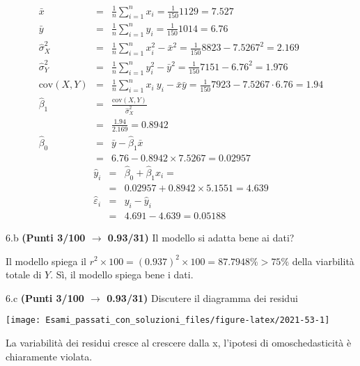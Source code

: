 \documentclass[
  11pt,
]{book}
\theoremstyle{mytheoremstyle}
\theoremstyle{mydefstyle}
\newenvironment{sol}
  {
  \begin{tcolorbox}[enhanced,breakable,arc=0.1mm,boxrule=1pt,colback=white,colframe=iblue,
  title=\bf \fontfamily{lmss}\selectfont \hspace{.5 cm} Soluzione,drop fuzzy shadow]

}{
\end{tcolorbox}
  }
\begin{document}
\begin{sol}
\begin{eqnarray*}
           \bar x &=&\frac 1 n\sum_{i=1}^n x_i = \frac {1}{ 150 }  1129 =  7.527 \\
           \bar y &=&\frac 1 n\sum_{i=1}^n y_i = \frac {1}{ 150 }  1014 =  6.76 \\
           \hat\sigma_X^2&=&\frac 1 n\sum_{i=1}^n x_i^2-\bar x^2=\frac {1}{ 150 }  8823  - 7.5267 ^2= 2.169 \\
           \hat\sigma_Y^2&=&\frac 1 n\sum_{i=1}^n y_i^2-\bar y^2=\frac {1}{ 150 }  7151  - 6.76 ^2= 1.976 \\
           \text{cov}(X,Y)&=&\frac 1 n\sum_{i=1}^n x_i~y_i-\bar x\bar y=\frac {1}{ 150 }  7923 - 7.5267 \cdot 6.76 = 1.94 \\
           \hat\beta_1 &=& \frac{\text{cov}(X,Y)}{\hat\sigma_X^2} \\
                    &=& \frac{ 1.94 }{ 2.169 }  =  0.8942 \\
           \hat\beta_0 &=& \bar y - \hat\beta_1 \bar x\\
                    &=&  6.76 - 0.8942 \times  7.5267 = 0.02957 
         \end{eqnarray*}\begin{eqnarray*}
\hat y_i &=&\hat\beta_0+\hat\beta_1 x_i=\\ 
&=& 0.02957 + 0.8942 \times 5.1551 = 4.639 \\ 
\hat \varepsilon_i &=& y_i-\hat y_i\\ 
&=& 4.691 - 4.639 = 0.05188  
\end{eqnarray*}

\end{sol}

6.b \textbf{(Punti 3/100 \(\rightarrow\) 0.93/31)} Il modello si adatta bene ai dati?

\begin{sol}
Il modello spiega il \(r^2\times100=(0.937)^2\times 100=87.7948\%>75\%\) della viarbilità totale di \(Y\). Sì, il modello spiega bene i dati.

\end{sol}

6.c \textbf{(Punti 3/100 \(\rightarrow\) 0.93/31)} Discutere il diagramma dei residui

\begin{center}\texttt{[image: Esami\_passati\_con\_soluzioni\_files/figure-latex/2021-53-1]} \end{center}

\begin{sol}
La variabilità dei residui cresce al crescere dalla x, l'ipotesi di omoschedasticità è chiaramente violata.

\end{sol}
\end{document}
